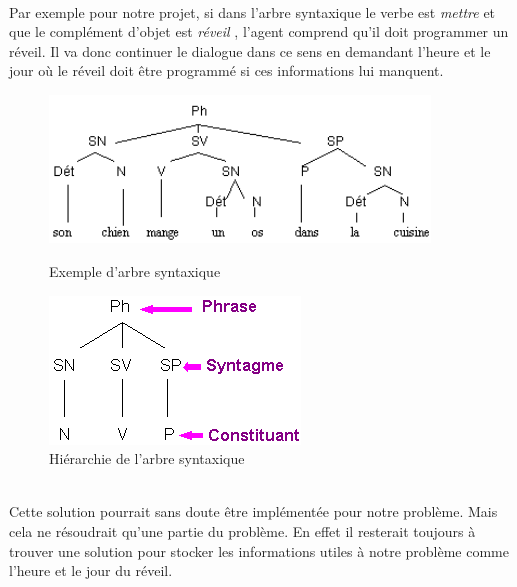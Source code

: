 ~\\\indent Par exemple pour notre projet, si dans l'arbre syntaxique le verbe est \og \textit{mettre} \fg{} et que le complément d'objet est \og \textit{réveil} \fg, l'agent \og comprend \fg{} qu'il doit programmer un réveil. Il va donc continuer le dialogue dans ce sens en demandant l'heure et le jour où le réveil doit être programmé si ces informations lui manquent.

\begin{figure}[!h]
    \centering
    \begin{minipage}{.5\textwidth}
        \centering
        \includegraphics[width=0.9\textwidth]{images/arbre.png}
        \caption{Exemple d'arbre syntaxique}
        \label{arbre-syntaxique}
    \end{minipage}%
    \begin{minipage}{0.5\textwidth}
        \centering
        \includegraphics[width=0.9\linewidth]{images/arbre2.png}
        \caption{Hiérarchie de l'arbre syntaxique}
        \label{arbre-syntaxique2}
    \end{minipage}
\end{figure}

~\\\indent
Cette solution pourrait sans doute être implémentée pour notre problème. Mais cela ne résoudrait qu'une partie du problème. En effet il resterait toujours à trouver une solution pour stocker les informations utiles à notre problème comme l'heure et le jour du réveil. 

